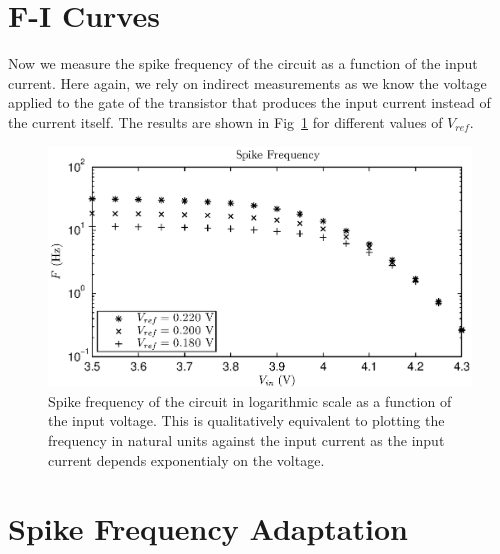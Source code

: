 \section{F-I Curves}
Now we measure the spike frequency of the circuit as a function of the input current. Here again, we rely on indirect measurements as we know the voltage applied to the gate of the transistor that produces the input current instead of the current itself. The results are shown in Fig~\ref{fig:exp1b} for different values of $V_{ref}$.\\

\begin{figure}[!h]
	\center
	\includegraphics{exp1b.eps}
	\caption{Spike frequency of the circuit in logarithmic scale as a function of the input voltage. This is qualitatively equivalent to plotting the frequency in natural units against the input current as the input current depends exponentialy on the voltage.}
	\label{fig:exp1b}
\end{figure}


\section{Spike Frequency Adaptation}



